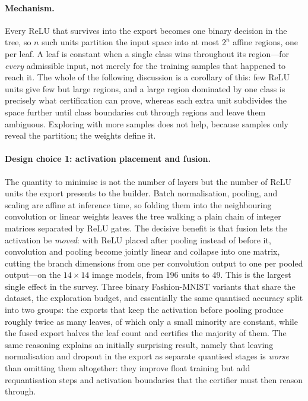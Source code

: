 \paragraph{Mechanism.}
Every \ac{ReLU} that survives into the export becomes one binary decision in the tree, so \(n\) such units partition the input space into at most \(2^n\) affine regions, one per leaf.
A leaf is constant when a single class wins throughout its region---for \emph{every} admissible input, not merely for the training samples that happened to reach it.
The whole of the following discussion is a corollary of this: few ReLU units give few but large regions, and a large region dominated by one class is precisely what certification can prove, whereas each extra unit subdivides the space further until class boundaries cut through regions and leave them ambiguous.
Exploring with more samples does not help, because samples only reveal the partition; the weights define it.

\paragraph{Design choice 1: activation placement and fusion.}
The quantity to minimise is not the number of layers but the number of ReLU units the export presents to the builder.
Batch normalisation, pooling, and scaling are affine at inference time, so folding them into the neighbouring convolution or linear weights leaves the tree walking a plain chain of integer matrices separated by ReLU gates.
The decisive benefit is that fusion lets the activation be \emph{moved}: with ReLU placed after pooling instead of before it, convolution and pooling become jointly linear and collapse into one matrix, cutting the branch dimensions from one per convolution output to one per pooled output---on the \(14{\times}14\) image models, from 196 units to 49.
This is the largest single effect in the survey.
Three binary Fashion-MNIST variants that share the dataset, the exploration budget, and essentially the same quantised accuracy split into two groups: the exports that keep the activation before pooling produce roughly twice as many leaves, of which only a small minority are constant, while the fused export halves the leaf count and certifies the majority of them.
The same reasoning explains an initially surprising result, namely that leaving normalisation and dropout in the export as separate quantised stages is \emph{worse} than omitting them altogether: they improve float training but add requantisation steps and activation boundaries that the certifier must then reason through.

